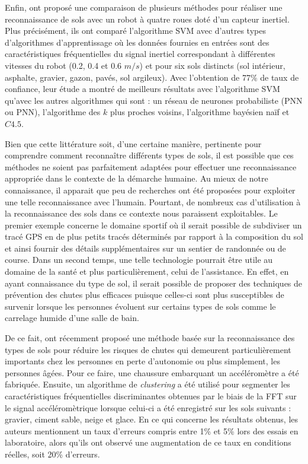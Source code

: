 Enfin, \cite{Weiss2007} ont proposé une comparaison de plusieurs méthodes pour réaliser une reconnaissance de sols avec un robot à quatre roues doté d'un capteur inertiel. Plus précisément, ils ont comparé l'algorithme \acs{SVM} avec d'autres types d'algorithmes d'apprentissage où les données fournies en entrées sont des caractéristiques fréquentielles du signal inertiel correspondant à différentes vitesses du robot (0.2, 0.4 et 0.6 $m/s$) et pour six sols distincts (sol intérieur, asphalte, gravier, gazon, pavés, sol argileux). Avec l'obtention de 77\% de taux de confiance, leur étude a montré de meilleurs résultats avec l'algorithme \acs{SVM} qu'avec les autres algorithmes qui sont : un réseau de neurones probabiliste (\acl{PNN} ou \acs{PNN}), l'algorithme des $k$ plus proches voisins, l'algorithme bayésien naïf et $C4.5$.

Bien que cette littérature soit, d'une certaine manière, pertinente pour comprendre comment reconnaître différents types de sols, il est possible que ces méthodes ne soient pas parfaitement adaptées pour effectuer une reconnaissance appropriée dans le contexte de la démarche humaine. Au mieux de notre connaissance, il apparait que peu de recherches ont été proposées pour exploiter une telle reconnaissance avec l'humain. Pourtant, de nombreux cas d'utilisation à la reconnaissance des sols dans ce contexte nous paraissent exploitables. Le premier exemple concerne le domaine sportif où il serait possible de subdiviser un tracé \acs{GPS} en de plus petits tracés déterminés par rapport à la composition du sol et ainsi fournir des détails supplémentaires sur un sentier de randonnée ou de course. Dans un second temps, une telle technologie pourrait être utile au domaine de la santé et plus particulièrement, celui de l'assistance. En effet, en ayant connaissance du type de sol, il serait possible de proposer des techniques de prévention des chutes plus efficaces puisque celles-ci sont plus susceptibles de survenir lorsque les personnes évoluent sur certains types de sols comme le carrelage humide d'une salle de bain.

De ce fait, \cite{Otis2016} ont récemment proposé une méthode basée sur la reconnaissance des types de sols pour réduire les risques de chutes qui demeurent particulièrement importants chez les personnes en perte d'autonomie ou plus simplement, les personnes âgées. Pour ce faire, une chaussure embarquant un accéléromètre a été fabriquée. Ensuite, un algorithme de \textit{clustering} a été utilisé pour segmenter les caractéristiques fréquentielles discriminantes obtenues par le biais de la \acs{FFT} sur le signal accéléromètrique lorsque celui-ci a été enregistré sur les sols suivants : gravier, ciment sable, neige et glace. En ce qui concerne les résultats obtenus, les auteurs mentionnent un taux d'erreurs compris entre 1\% et 5\% lors des essais en laboratoire, alors qu’ils ont observé une augmentation de ce taux en conditions réelles, soit 20\% d'erreurs.

